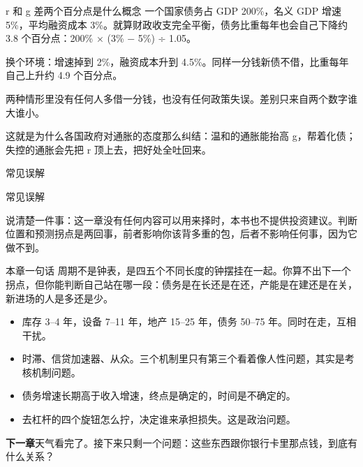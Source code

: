 \begin{egbox}{r 和 g 差两个百分点是什么概念}
一个国家债务占 GDP 200\%，名义 GDP 增速 5\%，平均融资成本 3\%。就算财政收支完全平衡，债务比重每年也会自己下降约 3.8 个百分点：200\% × (3\% − 5\%) ÷ 1.05。

换个环境：增速掉到 2\%，融资成本升到 4.5\%。同样一分钱新债不借，比重每年自己上升约 4.9 个百分点。

两种情形里没有任何人多借一分钱，也没有任何政策失误。差别只来自两个数字谁大谁小。

这就是为什么各国政府对通胀的态度那么纠结：温和的通胀能抬高 g，帮着化债；失控的通胀会先把 r 顶上去，把好处全吐回来。

\end{egbox}

\begin{mythbox}{常见误解}
\end{mythbox}

\begin{mythbox}{常见误解}
\end{mythbox}

说清楚一件事：这一章没有任何内容可以用来择时，本书也不提供投资建议。判断位置和预测拐点是两回事，前者影响你该背多重的包，后者不影响任何事，因为它做不到。

\begin{takeaway}{本章一句话}
周期不是钟表，是四五个不同长度的钟摆挂在一起。你算不出下一个拐点，但你能判断自己站在哪一段：债务是在长还是在还，产能是在建还是在关，新进场的人是多还是少。

\begin{itemize}
  \item 库存 3–4 年，设备 7–11 年，地产 15–25 年，债务 50–75 年。同时在走，互相干扰。
  \item 时滞、信贷加速器、从众。三个机制里只有第三个看着像人性问题，其实是考核机制问题。
  \item 债务增速长期高于收入增速，终点是确定的，时间是不确定的。
  \item 去杠杆的四个旋钮怎么拧，决定谁来承担损失。这是政治问题。
\end{itemize}

\end{takeaway}

\begin{bridgebox}
\textbf{下一章}天气看完了。接下来只剩一个问题：这些东西跟你银行卡里那点钱，到底有什么关系？
\end{bridgebox}

